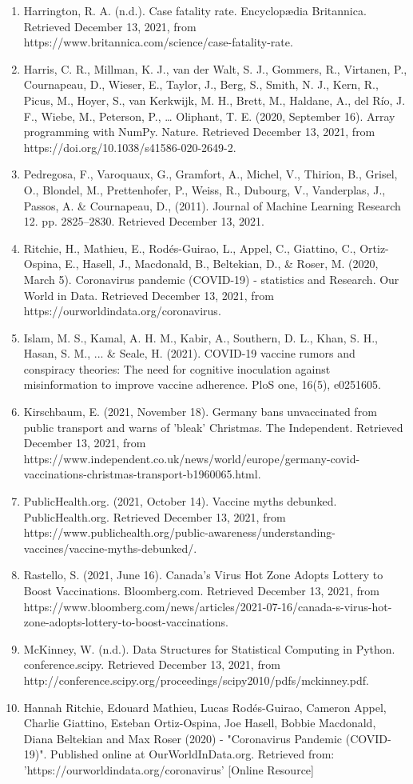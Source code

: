 \documentclass[fontsize=11pt]{article}
\begin{document}
\begin{enumerate}  
    \item Harrington, R. A. (n.d.). Case fatality rate. Encyclopædia Britannica. Retrieved December 13, 2021, from https://www.britannica.com/science/case-fatality-rate.   
    \item Harris, C. R., Millman, K. J., van der Walt, S. J., Gommers, R., Virtanen, P., Cournapeau, D., Wieser, E., Taylor, J., Berg, S., Smith, N. J., Kern, R., Picus, M., Hoyer, S., van Kerkwijk, M. H., Brett, M., Haldane, A., del Río, J. F., Wiebe, M., Peterson, P., … Oliphant, T. E. (2020, September 16). Array programming with NumPy. Nature. Retrieved December 13, 2021, from https://doi.org/10.1038/s41586-020-2649-2. 
    \item Pedregosa, F., Varoquaux, G., Gramfort, A.,  Michel, V., Thirion, B., Grisel, O., Blondel, M., Prettenhofer, P., Weiss, R., Dubourg, V., Vanderplas, J., Passos, A. \& Cournapeau, D., (2011). Journal of Machine Learning Research 12. pp. 2825–2830. Retrieved December 13, 2021.
    \item Ritchie, H., Mathieu, E., Rodés-Guirao, L., Appel, C., Giattino, C., Ortiz-Ospina, E., Hasell, J., Macdonald, B., Beltekian, D., \& Roser, M. (2020, March 5). Coronavirus pandemic (COVID-19) - statistics and Research. Our World in Data. Retrieved December 13, 2021, from https://ourworldindata.org/coronavirus. 
    \item Islam, M. S., Kamal, A. H. M., Kabir, A., Southern, D. L., Khan, S. H., Hasan, S. M., ... \& Seale, H. (2021). COVID-19 vaccine rumors and conspiracy theories: The need for cognitive inoculation against misinformation to improve vaccine adherence. PloS one, 16(5), e0251605.
    \item Kirschbaum, E. (2021, November 18). Germany bans unvaccinated from public transport and warns of 'bleak' Christmas. The Independent. Retrieved December 13, 2021, from https://www.independent.co.uk/news/world/europe/germany-covid-vaccinations-christmas-transport-b1960065.html. 
    \item PublicHealth.org. (2021, October 14). Vaccine myths debunked. PublicHealth.org. Retrieved December 13, 2021, from https://www.publichealth.org/public-awareness/understanding-vaccines/vaccine-myths-debunked/. 
    \item Rastello, S. (2021, June 16). Canada’s Virus Hot Zone Adopts Lottery to Boost Vaccinations. Bloomberg.com. Retrieved December 13, 2021, from https://www.bloomberg.com/news/articles/2021-07-16/canada-s-virus-hot-zone-adopts-lottery-to-boost-vaccinations. 
    \item McKinney, W. (n.d.). Data Structures for Statistical Computing in Python. conference.scipy. Retrieved December 13, 2021, from http://conference.scipy.org/proceedings/scipy2010/pdfs/mckinney.pdf. 
    \item Hannah Ritchie, Edouard Mathieu, Lucas Rodés-Guirao, Cameron Appel, Charlie Giattino, Esteban Ortiz-Ospina, Joe Hasell, Bobbie Macdonald, Diana Beltekian and Max Roser (2020) - "Coronavirus Pandemic (COVID-19)". Published online at OurWorldInData.org. Retrieved from: 'https://ourworldindata.org/coronavirus' [Online Resource] 
\end{enumerate}  
\end{document}
